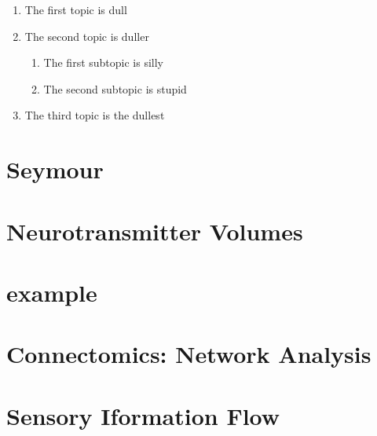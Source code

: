 \begin{enumerate}
\item The first topic is dull
\item The second topic is duller
\begin{enumerate}
\item The first subtopic is silly
\item The second subtopic is stupid
\end{enumerate}
\item The third topic is the dullest
\end{enumerate}


\section*{Seymour}
 

\section*{Neurotransmitter Volumes}
\section*{example}

\clearpage



\tochide\section{Connectomics: Network Analysis}

\section*{Sensory Iformation Flow}


